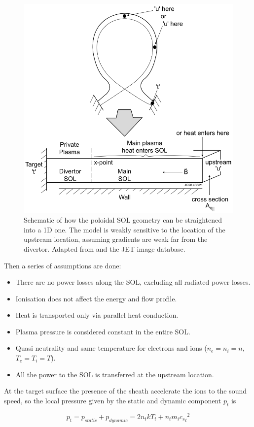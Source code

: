 \begin{figure}
	\centering
	\includegraphics[trim={0 0 0 0},clip,width=0.65\linewidth]{Chapters/chapter1/figs/2PM.png}
	\caption{Schematic of how the poloidal SOL geometry can be straightened into a 1D one. The model is weakly sensitive to the location of the upstream location, assuming gradients are weak far from the divertor.\cite{Verhaegh2018} Adapted from \cite{Harrison2011} and the JET image database.}
	\label{fig:2PM}
\end{figure}

Then a series of assumptions are done:
\begin{itemize}
    \item There are no power losses along the SOL, excluding all radiated power losses.
    \item Ionisation does not affect the energy and flow profile.
    \item Heat is transported only via parallel heat conduction.
    \item Plasma pressure is considered constant in the entire SOL.
    \item Quasi neutrality and same temperature for electrons and ions ($n_e = n_i = n$, $T_e = T_i = T$).
    \item All the power to the SOL is transferred at the upstream location.
\end{itemize}

At the target surface the presence of the sheath accelerate the ions to the sound speed, so the local pressure given by the static and dynamic component $p_t$ is

\begin{equation}
p_{t} = p_{static} + p_{dynamic} = 2n_{t} k T_{t} + n_{t} m_i {{c_s}_t}^2
\label{eq:2pm1}
\end{equation}

